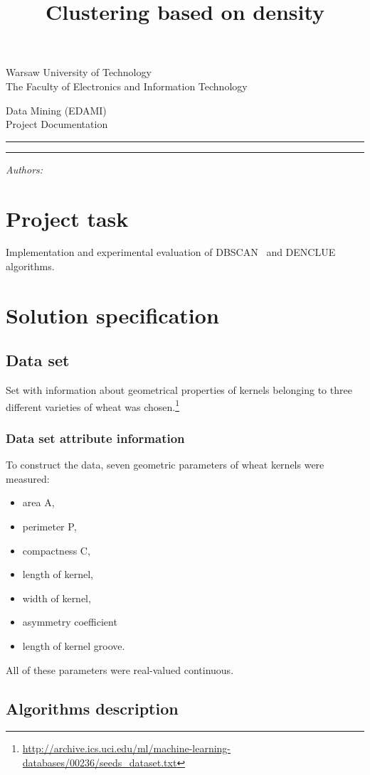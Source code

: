 \documentclass[12pt, a4paper, notitlepage, oneside]{article}
\title{Clustering based on density}
\makeatletter
\newcommand{\linia}{\rule{\linewidth}{0.4mm}}
\renewcommand{\maketitle}{
\begin{titlepage}

    \vspace*{1cm}

    \begin{center}\small

    Warsaw University of Technology\\
    The Faculty of Electronics and Information Technology\\

    \end{center}

    \vspace{3cm}

     \begin{center}

    Data Mining (EDAMI)\\ Project Documentation

    \end{center}

    \noindent\linia

    \begin{center}

      \LARGE \textsc{\@title}

         \end{center}

     \noindent\linia

    \vspace{0.5cm}

    \begin{flushright}

    \begin{minipage}{5cm}

    \textit{\small Authors:}\\

    \normalsize \textsc{\@author} \par

    \end{minipage}

    \vspace{4cm}
    
 

     \end{flushright}

    \vspace*{\stretch{6}}

    \begin{center}

    \@date

    \end{center}

  \end{titlepage}
}
\makeatother
\begin{document}
\maketitle


\onehalfspacing


\section*{Project task}
Implementation and experimental evaluation of DBSCAN~\cite{dbscan} and DENCLUE~\cite{denclue} algorithms. 

\section*{Solution specification}

\subsection*{Data set}

Set with information about geometrical properties of kernels belonging to three different varieties of wheat was chosen.\footnote{\url{http://archive.ics.uci.edu/ml/machine-learning-databases/00236/seeds_dataset.txt}}

\subsubsection*{Data set attribute information}


To construct the data, seven geometric parameters of wheat kernels were measured: 

\begin{itemize}
	\item area A, 
	\item perimeter P, 
	\item compactness C, 
	\item length of kernel, 
	\item width of kernel, 
	\item asymmetry coefficient 
	\item length of kernel groove. 
\end{itemize}

All of these parameters were real-valued continuous.


\subsection*{Algorithms description}
 
\end{document}
